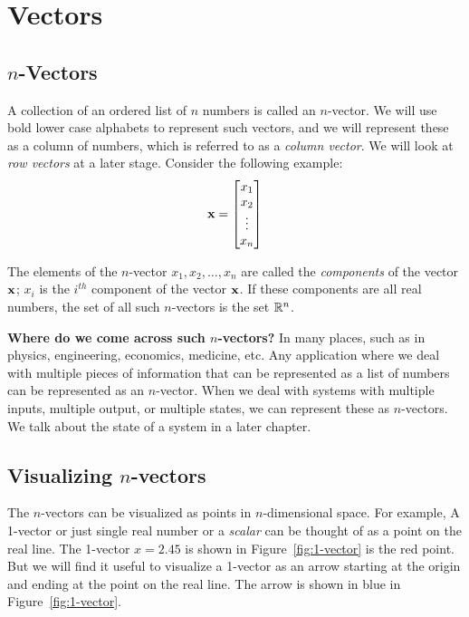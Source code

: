 \chapter{Vectors}\label{chp:vectors}


\section{$n$-Vectors}
A collection of an ordered list of $n$ numbers is called an $n$-vector. We will use bold lower case alphabets to represent such vectors, and we will represent these as a column of numbers, which is referred to as a \textit{column vector}. We will look at \textit{row vectors} at a later stage. Consider the following example:
\[ \mf{x} = \bmxc x_1 \\ x_2 \\ \vdots \\x_n \emx \]

The elements of the $n$-vector $x_1, x_2, \ldots, x_n$ are called the \textit{components} of the vector $\mathbf{x}$; $x_i$ is the $i^{th}$ component of the vector $\mathbf{x}$. If these components are all real numbers, the set of all such $n$-vectors is the set $\mathbb{R}^n$.

\noindent \textbf{Where do we come across such $n$-vectors?} In many places, such as in physics, engineering, economics, medicine, etc. Any application where we deal with multiple pieces of information that can be represented as a list of numbers can be represented as an $n$-vector. When we deal with systems with multiple inputs, multiple output, or multiple states, we can represent these as $n$-vectors. We talk about the state of a system in a later chapter.

\section{Visualizing $n$-vectors}
The $n$-vectors can be visualized as points in $n$-dimensional space. For example, A 1-vector or just single real number or a \textit{scalar} can be thought of as a point on the real line. The 1-vector $x = 2.45$ is shown in Figure~\ref{fig:1-vector} is the red point. But we will find it useful to visualize a 1-vector as an arrow starting at the origin and ending at the point on the real line. The arrow is shown in blue in Figure~\ref{fig:1-vector}. 

